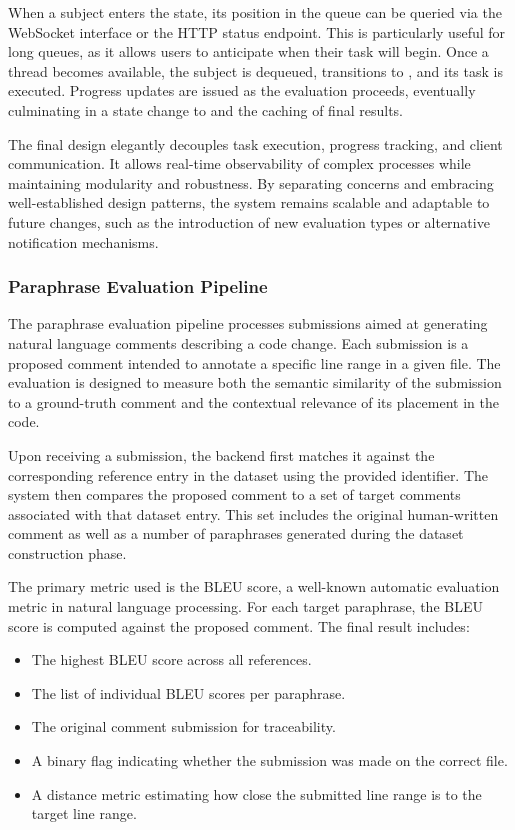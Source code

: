 When a subject enters the  state, its position in the queue can be queried via the
WebSocket interface or the HTTP status endpoint. This is particularly useful for long queues, as it
allows users to anticipate when their task will begin. Once a thread becomes available, the subject
is dequeued, transitions to , and its task is executed. Progress updates are
issued as the evaluation proceeds, eventually culminating in a state change to  and
the caching of final results.

The final design elegantly decouples task execution, progress tracking, and client communication. It
allows real-time observability of complex processes while maintaining modularity and robustness. By
separating concerns and embracing well-established design patterns, the system remains scalable and
adaptable to future changes, such as the introduction of new evaluation types or alternative
notification mechanisms.


\subsubsection{Paraphrase Evaluation Pipeline}
\label{sec:paraphrases-check}

The paraphrase evaluation pipeline processes submissions aimed at generating natural language
comments describing a code change. Each submission is a proposed comment intended to annotate a
specific line range in a given file. The evaluation is designed to measure both the semantic
similarity of the submission to a ground-truth comment and the contextual relevance of its placement
in the code.

Upon receiving a submission, the backend first matches it against the corresponding reference entry
in the dataset using the provided identifier. The system then compares the proposed comment to a set
of target comments associated with that dataset entry. This set includes the original human-written
comment as well as a number of paraphrases generated during the dataset construction phase.

The primary metric used is the BLEU score, a well-known automatic evaluation metric in natural
language processing. For each target paraphrase, the BLEU score is computed against the proposed
comment. The final result includes:
\begin{itemize}
	\item The highest BLEU score across all references.
	\item The list of individual BLEU scores per paraphrase.
	\item The original comment submission for traceability.
	\item A binary flag indicating whether the submission was made on the correct file.
	\item A distance metric estimating how close the submitted line range is to the target line range.
\end{itemize}

